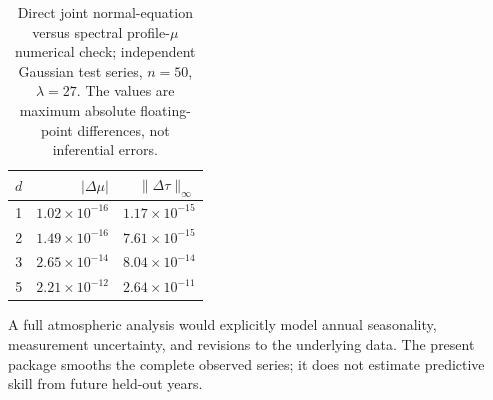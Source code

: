 \begin{table}[tbp]
\centering
\caption{Direct joint normal-equation versus spectral
profile-$\mu$ numerical check; independent Gaussian test series,
$n=50$, $\lambda=27$. The values are maximum absolute
floating-point differences, not inferential errors.}
\label{tab:mu-check}
\begin{tabular}{rrr}\toprule
$d$ & $|\Delta\mu|$ & $\|\Delta\tau\|_\infty$\\\midrule
1 & $1.02\times10^{-16}$ & $1.17\times10^{-15}$\\
2 & $1.49\times10^{-16}$ & $7.61\times10^{-15}$\\
3 & $2.65\times10^{-14}$ & $8.04\times10^{-14}$\\
5 & $2.21\times10^{-12}$ & $2.64\times10^{-11}$\\\bottomrule
\end{tabular}
\end{table}

A full atmospheric analysis would explicitly model annual
seasonality, measurement uncertainty, and revisions to the
underlying data. The present package smooths the complete
observed series; it does not estimate predictive skill from
future held-out years.
